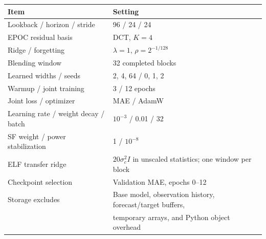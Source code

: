 {\fontsize{9}{11}\selectfont
\begin{tabular}{ll}
\toprule
Item & Setting \\
\midrule
Lookback / horizon / stride & 96 / 24 / 24 \\
EPOC residual basis & DCT, $K=4$ \\
Ridge / forgetting & $\lambda=1$, $\rho=2^{-1/128}$ \\
Blending window & 32 completed blocks \\
Learned widths / seeds & 2, 4, 64 / 0, 1, 2 \\
Warmup / joint training & 3 / 12 epochs \\
Joint loss / optimizer & MAE / AdamW \\
Learning rate / weight decay / batch & $10^{-3}$ / 0.01 / 32 \\
SF weight / power stabilization & 1 / $10^{-8}$ \\
ELF transfer ridge & $20\sigma_c^2 I$ in unscaled statistics; one window per block \\
Checkpoint selection & Validation MAE, epochs 0--12 \\
Storage excludes & Base model, observation history, forecast/target buffers,\\
 & temporary arrays, and Python object overhead \\
\bottomrule
\end{tabular}
}
